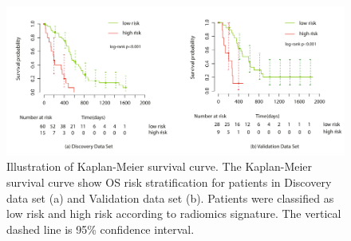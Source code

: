 \documentclass[
]{beamer}
\begin{document}
	\begin{frame}
		\begin{figure}
			\includegraphics[scale=0.45]{km1}
			\caption{Illustration of Kaplan-Meier survival curve. The Kaplan-Meier survival curve show OS risk
				stratification for patients in Discovery data set (a) and Validation data set (b). Patients were classified as low risk
				and high risk according to radiomics signature. The vertical dashed line is 95\% confidence interval.}
		\end{figure}
	\end{frame}
	
	
\end{document}
